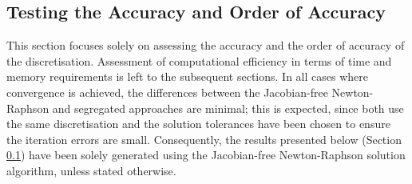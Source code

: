 \documentclass[sn-mathphys,Numbered]{sn-jnl}%
\begin{document}
\subsection{Testing the Accuracy and Order of Accuracy}
\label{sec:accuracy}
This section focuses solely on assessing the accuracy and the order of accuracy of the discretisation.
Assessment of computational efficiency in terms of time and memory requirements is left to the subsequent sections.
In all cases where convergence is achieved, the differences between the Jacobian-free Newton-Raphson and segregated approaches are minimal; this is expected, since both use the same discretisation and the solution tolerances have been chosen to ensure the iteration errors are small.
Consequently, the results presented below (Section \ref{sec:accuracy}) have been solely generated using the Jacobian-free Newton-Raphson solution algorithm, unless stated otherwise.


 
\end{document}
